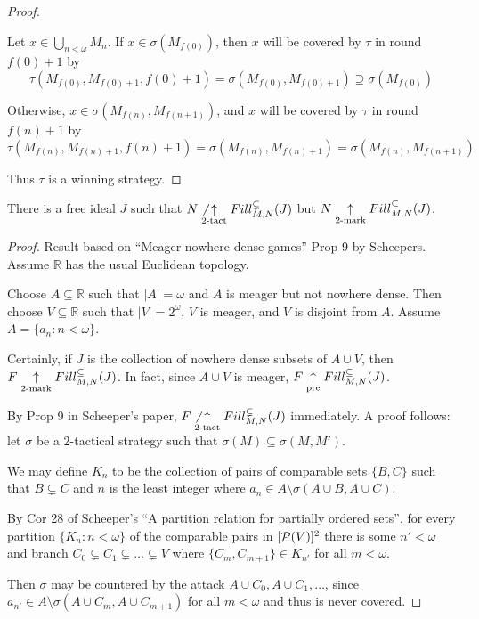 \begin{proof}
\begin{itemize}
          Let $x \in \bigcup_{n<\omega}M_n$. If $x\in\sigma(M_{f(0)})$, then $x$ will be covered by $\tau$ in round $f(0)+1$ by
            \[
              \tau(M_{f(0)},M_{f(0)+1},f(0)+1)
              = \sigma(M_{f(0)},M_{f(0)+1})
              \supseteq \sigma(M_{f(0)})
            \]

          Otherwise, $x\in\sigma(M_{f(n)},M_{f(n+1)})$, and $x$ will be covered by $\tau$ in round $f(n)+1$ by
            \[
              \tau(M_{f(n)},M_{f(n)+1},f(n)+1)
              = \sigma(M_{f(n)},M_{f(n)+1})
              = \sigma(M_{f(n)},M_{f(n+1)})
            \]
      \end{itemize}

      Thus $\tau$ is a winning strategy.
  \end{proof}

  \begin{example}
    There is a free ideal $J$ such that $N\not\underset{2\text{-tact}}{\uparrow}Fill^{\subsetneq}_{M,N}(J)$ but $N\underset{2\text{-mark}}{\uparrow}Fill^{\subseteq}_{M,N}(J)$.
  \end{example}

  \begin{proof}
    Result based on ``Meager nowhere dense games'' Prop 9 by Scheepers. Assume $\mathbb{R}$ has the usual Euclidean topology.

    Choose $A\subseteq\mathbb{R}$ such that $|A|=\omega$ and $A$ is meager but not nowhere dense. Then choose $V\subseteq\mathbb{R}$ such that $|V|=2^\omega$, $V$ is meager, and $V$ is disjoint from $A$. Assume $A=\{a_n:n<\omega\}$.

    Certainly, if $J$ is the collection of nowhere dense subsets of $A\cup V$, then $F\underset{2\text{-mark}}{\uparrow}Fill^{\subseteq}_{M,N}(J)$. In fact, since $A\cup V$ is meager, $F\underset{\text{pre}}{\uparrow}Fill^{\subseteq}_{M,N}(J)$. 

    By Prop 9 in Scheeper's paper, $F\not\underset{2\text{-tact}}{\uparrow}Fill^{\subsetneq}_{M,N}(J)$ immediately. A proof follows: let $\sigma$ be a $2$-tactical strategy such that $\sigma(M)\subseteq\sigma(M,M')$.

    We may define $K_n$ to be the collection of pairs of comparable sets $\{B,C\}$ such that $B\subsetneq C$ and $n$ is the least integer where $a_n \in A \setminus \sigma(A\cup B,A\cup C)$.

    By Cor 28 of Scheeper's ``A partition relation for partially ordered sets'', for every partition $\{K_n:n<\omega\}$ of the comparable pairs in $[\mathcal{P}(V)]^2$ there is some $n'<\omega$ and branch $C_0\subsetneq C_1\subsetneq \dots\subsetneq V$ where $\{C_m,C_{m+1}\}\in K_{n'}$ for all $m<\omega$.

    Then $\sigma$ may be countered by the attack $A\cup C_0, A\cup C_1, \dots$, since $a_{n'} \in A \setminus \sigma(A\cup C_m,A\cup C_{m+1})$ for all $m<\omega$ and thus is never covered.
  \end{proof}

















